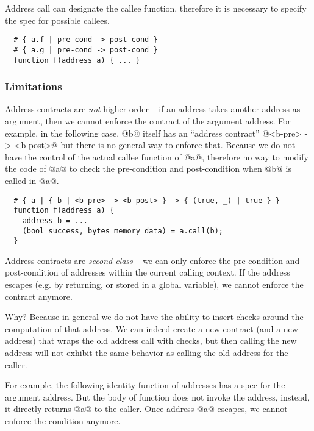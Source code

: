 \documentclass[acmsmall,review,anonymous]{acmart}\settopmatter{printfolios=true,printccs=false,printacmref=false}
\begin{document}
Address call can designate the callee function, therefore it is necessary to
specify the spec for possible callees.

\begin{lstlisting}
  # { a.f | pre-cond -> post-cond }
  # { a.g | pre-cond -> post-cond }
  function f(address a) { ... }
\end{lstlisting}


\subsubsection*{Limitations}
Address contracts are \emph{not} higher-order -- if an address takes another
address as argument, then we cannot enforce the contract of the argument
address.
For example, in the following case, @b@ itself has an ``address contract''
@<b-pre> -> <b-post>@ but there is no general way to enforce that.
Because we do not have the control of the actual callee function of @a@,
therefore no way to modify the code of @a@ to check the pre-condition
and post-condition when @b@ is called in @a@.

\begin{lstlisting}
  # { a | { b | <b-pre> -> <b-post> } -> { (true, _) | true } }
  function f(address a) {
    address b = ...
    (bool success, bytes memory data) = a.call(b);
  }
\end{lstlisting}

Address contracts are \emph{second-class} -- we can only enforce the
pre-condition and post-condition of addresses within the current calling
context.  If the address escapes (e.g. by returning, or stored in a global
variable), we cannot enforce the contract anymore.

Why? Because in general we do not have the ability to insert checks around the
computation of that address. We can indeed create a new contract (and a new address) that wraps the old address call with checks, but then calling
the new address will not exhibit the same behavior as calling the old address
for the caller.

For example, the following identity function of addresses has a spec
for the argument address. But the body of function does not invoke
the address, instead, it directly returns @a@ to the caller.
Once address @a@ escapes, we cannot enforce the condition anymore.
\end{document}
